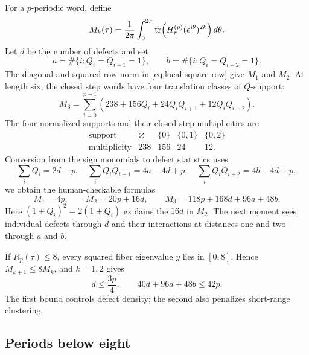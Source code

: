 For a $p$-periodic word, define
\begin{equation}
 M_k(\tau)=\frac1{2\pi}\int_0^{2\pi}
 \operatorname{tr}\!\left(H_\tau^{(p)}(e^{\mathrm i\theta})^{2k}\right)d\theta.
 \label{eq:phase-averaged-moments}
\end{equation}
Let $d$ be the number of defects and set
\begin{equation}
 a=\#\{i:Q_i=Q_{i+1}=1\},\qquad
 b=\#\{i:Q_i=Q_{i+2}=1\}.
 \label{eq:defect-statistics}
\end{equation}
The diagonal and squared row norm in \eqref{eq:local-square-row} give $M_1$
and $M_2$.  At length six, the closed step words have four translation classes
of $Q$-support:
\begin{equation}
 M_3=\sum_{i=0}^{p-1}
 \left(238+156Q_i+24Q_iQ_{i+1}+12Q_iQ_{i+2}\right).
 \label{eq:m3-q-expansion}
\end{equation}
The four normalized supports and their closed-step multiplicities are
\[
\begin{array}{c|cccc}
\text{support}&\varnothing&\{0\}&\{0,1\}&\{0,2\}\\ \hline
\text{multiplicity}&238&156&24&12.
\end{array}
\]
Conversion from the sign monomials to defect statistics uses
\[
 \sum_iQ_i=2d-p,\quad
 \sum_iQ_iQ_{i+1}=4a-4d+p,\quad
 \sum_iQ_iQ_{i+2}=4b-4d+p,
\]
we obtain the human-checkable formulas
\begin{equation}
 M_1=4p,\qquad M_2=20p+16d,\qquad
 M_3=118p+168d+96a+48b.
 \label{eq:first-three-moments}
\end{equation}
Here $(1+Q_i)^2=2(1+Q_i)$ explains the $16d$ in $M_2$.
The next moment sees individual defects through $d$ and their interactions at
distances one and two through $a$ and $b$.

If $R_p(\tau)\leq8$, every squared fiber eigenvalue $y$ lies in $[0,8]$.
Hence $M_{k+1}\leq8M_k$, and $k=1,2$ gives
\begin{equation}
 d\leq\frac{3p}{4},\qquad
 40d+96a+48b\leq42p.
 \label{eq:moment-excess-inequalities}
\end{equation}
The first bound controls defect density; the second also penalizes short-range
clustering.

\subsection{Periods below eight}

